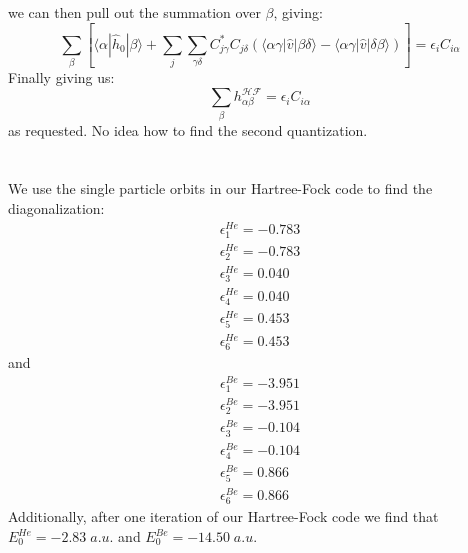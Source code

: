 \documentclass{article}
\begin{document}
we can then pull out the summation over $\beta$, giving:
\begin{equation*}
    \sum_\beta \left[\langle \alpha| \hat h_0 | \beta \rangle + \sum_j \sum_{\gamma \delta} C_{j\gamma}^* C_{j\delta} \left( \langle \alpha \gamma | \hat v | \beta \delta \rangle - \langle \alpha \gamma | \hat v | \delta \beta \rangle \right) \right] = \epsilon_i C_{i\alpha}
\end{equation*}
Finally giving us:
\begin{equation}
    \sum_\beta h_{\alpha\beta}^{\mathcal{H}\mathcal{F}} = \epsilon_i C_{i \alpha}
\end{equation}
as requested. 
\newline
No idea how to find the second quantization.
\section{}
We use the single particle orbits in our Hartree-Fock code to find the diagonalization:
\begin{gather*}
    \epsilon_1^{He} = -0.783 \\ 
    \epsilon_2^{He} = -0.783 \\
    \epsilon_3^{He} = 0.040 \\
    \epsilon_4^{He} = 0.040 \\
    \epsilon_5^{He} = 0.453 \\
    \epsilon_6^{He} = 0.453
\end{gather*}
and
\begin{gather*}
    \epsilon_1^{Be} = -3.951 \\
    \epsilon_2^{Be} = -3.951 \\
    \epsilon_3^{Be} = -0.104 \\
    \epsilon_4^{Be} = -0.104 \\
    \epsilon_5^{Be} = 0.866 \\
    \epsilon_6^{Be} = 0.866
\end{gather*}
Additionally, after one iteration of our Hartree-Fock code we find that $E_0^{He} = -2.83\;a.u.$ and $E_0^{Be} = -14.50 \;a.u.$
\newpage
\end{document}
